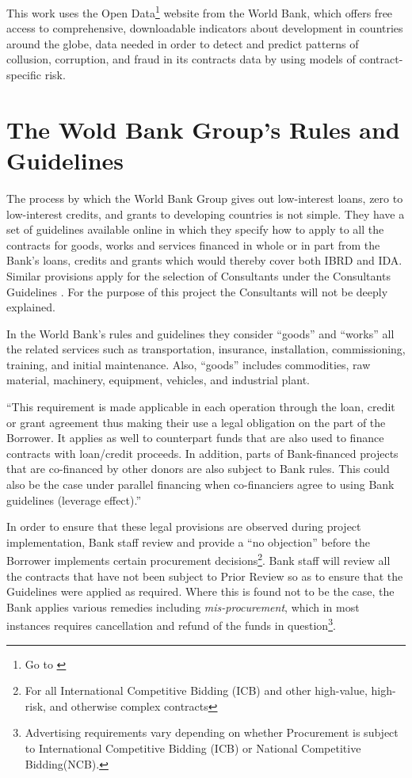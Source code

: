 This work uses the Open Data\footnote{Go to \cite{wb_data}} website from the World Bank, which offers free access to comprehensive, downloadable indicators about development in countries around the globe, data needed in order to detect and predict patterns of collusion, corruption, and fraud in its contracts data by using models of contract-specific risk. 

\section{The Wold Bank Group's Rules and Guidelines}

The process by which the World Bank Group gives out low-interest loans, zero to low-interest credits, and grants to developing countries is not simple. They have a set of guidelines available online \parencite{wb_g_proc} in which they specify how to apply to all the contracts for goods, works and services financed in whole or in part from the Bank's loans, credits and grants which would thereby cover both IBRD and IDA. Similar provisions apply for the selection of Consultants under the Consultants Guidelines \parencite{wb_g_cons}. For the purpose of this project the Consultants will not be deeply explained. 

In the World Bank's rules and guidelines they consider ``goods'' and ``works'' all the related services such as transportation, insurance, installation, commissioning, training, and initial maintenance. Also,  ``goods'' includes commodities, raw material, machinery, equipment, vehicles, and industrial plant. 

``This requirement is made applicable in each operation through the loan, credit or grant agreement thus making their use a legal obligation on the part of the Borrower. It applies as well to counterpart funds that are also used to finance contracts with loan/credit proceeds. In addition, parts of Bank-financed projects that are co-financed by other donors are also subject to Bank rules. This could also be the case under parallel financing when co-financiers agree to using Bank guidelines (leverage effect).''\parencite{wb_rules}

In order to ensure that these legal provisions are observed during project implementation, Bank staff review and provide a ``no objection'' before the Borrower implements certain procurement decisions\footnote{For all International Competitive Bidding (ICB) and other high-value, high-risk, and otherwise complex contracts}. Bank staff will review all the contracts that have not been subject to Prior Review so as to ensure that the Guidelines were applied as required. Where this is found not to be the case, the Bank applies various remedies including \textit{mis-procurement}, which in most instances requires cancellation and refund of the funds in question\footnote{Advertising requirements vary depending on whether Procurement is subject to International Competitive Bidding (ICB) or National Competitive Bidding(NCB).}.

